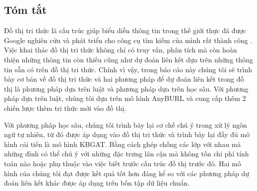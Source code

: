 \begin{center}
\begingroup
\section*{Tóm tắt}
\label{chap:Abstract}

\begin{adjustwidth}{1.5cm}{1.5cm}
	Đồ thị tri thức là cấu trúc giúp biểu diễn thông tin trong thế giới thực đã được Google nghiên cứu và phát triển cho công cụ tìm kiếm của mình rất thành công \cite{googlekg:2020}. Việc khai thác đồ thị tri thức không chỉ có truy vấn, phân tích mà còn hoàn thiện những thông tin còn thiếu cũng như dự đoán liên kết dựa trên những thông tin sẵn có trên đồ thị tri thức. Chính vì vậy, trong báo cáo này chúng tôi sẽ trình bày cơ bản về đồ thị tri thức và hai phương pháp để dự đoán liên kết trong đồ thị là phương pháp dựa trên luật và phương pháp dựa trên học sâu.
	Với phương pháp dựa trên luật, chúng tôi dựa trên mô hình AnyBURL và cung cấp thêm 2 chiến lược thêm tri thức mới vào đồ thị.
	
	Với phương pháp học sâu, chúng tôi trình bày lại cơ chế chú ý trong xử lý ngôn ngữ tự nhiên, từ đó được áp dụng vào đồ thị tri thức và trình bày lại đầy đủ mô hình cải tiến là mô hình KBGAT. Bằng cách ghép chồng các lớp với nhau mà những đỉnh có thể chú ý với những đặc trưng lân cận mà không tốn chi phí tính toán nào hoặc phụ thuộc vào việc biết trước cấu trúc đồ thị trước đó.
	Hai mô hình của chúng tôi đạt được kết quả tốt hơn đáng kể so với các phương pháp dự đoán liên kết khác được áp dụng trên bốn tập dữ liệu chuẩn.
\end{adjustwidth}
\endgroup
\end{center}